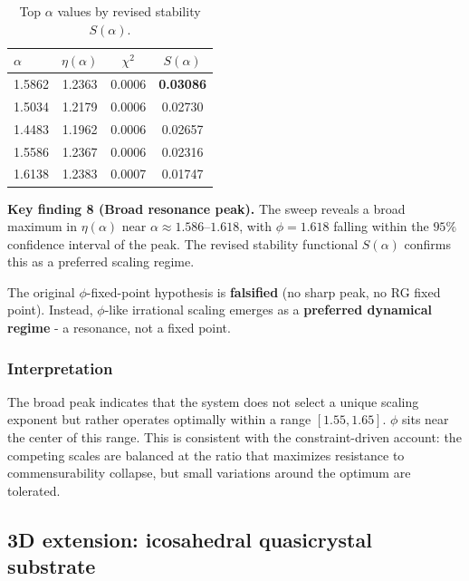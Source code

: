 \documentclass[12pt,a4paper]{article}
\theoremstyle{plain}
\theoremstyle{definition}
\begin{document}
\begin{table}[H]
\centering
\caption{Top $\alpha$ values by revised stability $S(\alpha)$.}
\label{tab:phi_sweep}
\begin{tabular}{lccc}
\toprule
$\alpha$ & $\eta(\alpha)$ & $\chi^2$ & $S(\alpha)$ \\
\midrule
1.5862 & 1.2363 & 0.0006 & \textbf{0.03086} \\
1.5034 & 1.2179 & 0.0006 & 0.02730 \\
1.4483 & 1.1962 & 0.0006 & 0.02657 \\
1.5586 & 1.2367 & 0.0006 & 0.02316 \\
1.6138 & 1.2383 & 0.0007 & 0.01747 \\
\bottomrule
\end{tabular}
\end{table}

\newpage
\begin{keyresult}
\textbf{Key finding 8 (Broad resonance peak).}
The sweep reveals a broad maximum in $\eta(\alpha)$ near
$\alpha \approx 1.586$--$1.618$, with $\phi = 1.618$ falling
within the $95\%$ confidence interval of the peak. The revised stability
functional $S(\alpha)$ confirms this as a preferred scaling regime.

The original $\phi$-fixed-point hypothesis is \textbf{falsified}
(no sharp peak, no RG fixed point). Instead, $\phi$-like irrational
scaling emerges as a \textbf{preferred dynamical regime} - a resonance,
not a fixed point.
\end{keyresult}

\subsubsection{Interpretation}

The broad peak indicates that the system does not select a unique
scaling exponent but rather operates optimally within a range
$[1.55, 1.65]$. $\phi$ sits near the center of this range.
This is consistent with the constraint-driven account: the competing
scales are balanced at the ratio that maximizes resistance to
commensurability collapse, but small variations around the optimum
are tolerated.

\subsection{3D extension: icosahedral quasicrystal substrate}
\label{sec:3d}
\end{document}
